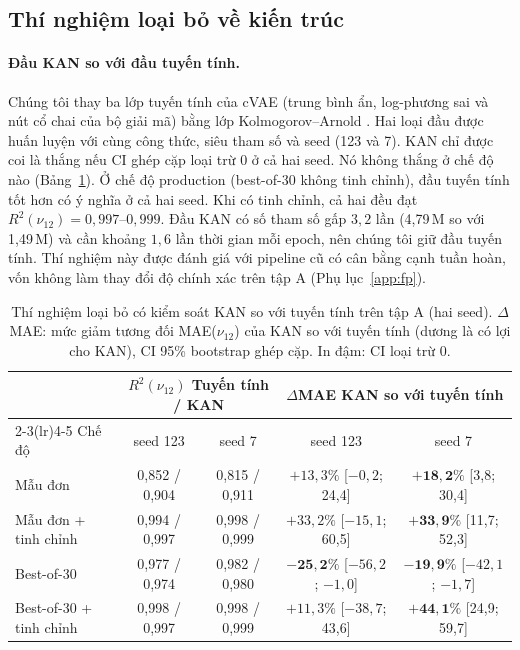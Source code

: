 \documentclass[a4paper,11pt]{article}
\newcommand{\nuot}{\nu_{12}}
\newcommand{\RR}{R^2}
\begin{document}
\subsection{Thí nghiệm loại bỏ về kiến trúc}

\paragraph{Đầu KAN so với đầu tuyến tính.}
Chúng tôi thay ba lớp tuyến tính của cVAE (trung bình ẩn, log-phương sai và
nút cổ chai của bộ giải mã) bằng lớp Kolmogorov--Arnold \citep{liu2024kan}.
Hai loại đầu được huấn luyện với cùng công thức, siêu tham số và seed (123 và
7). KAN chỉ được coi là thắng nếu CI ghép cặp loại trừ 0 ở cả hai seed. Nó
không thắng ở chế độ nào (Bảng~\ref{tab:kan}). Ở chế độ production
(best-of-30 không tinh chỉnh), đầu tuyến tính tốt hơn có ý nghĩa ở cả hai
seed. Khi có tinh chỉnh, cả hai đều đạt $\RR(\nuot)=0,997$--$0,999$. Đầu KAN
có số tham số gấp $3,2$ lần (4,79\,M so với 1,49\,M) và cần khoảng $1,6$ lần
thời gian mỗi epoch, nên chúng tôi giữ đầu tuyến tính. Thí nghiệm này được
đánh giá với pipeline cũ có cân bằng cạnh tuần hoàn, vốn không làm thay đổi
độ chính xác trên tập A (Phụ lục~\ref{app:fp}).

\begin{table}[t]
\centering
\caption{Thí nghiệm loại bỏ có kiểm soát KAN so với tuyến tính trên tập A (hai
seed). $\Delta$MAE: mức giảm tương đối MAE($\nuot$) của KAN so với tuyến tính
(dương là có lợi cho KAN), CI 95\% bootstrap ghép cặp. In đậm: CI loại trừ 0.}
\label{tab:kan}
\small
\setlength{\tabcolsep}{4pt}
\begin{tabular}{lcccc}
\toprule
 & \multicolumn{2}{c}{$\RR(\nuot)$ Tuyến tính / KAN} & \multicolumn{2}{c}{$\Delta$MAE KAN so với tuyến tính}\\
\cmidrule(lr){2-3}\cmidrule(lr){4-5}
Chế độ & seed 123 & seed 7 & seed 123 & seed 7\\
\midrule
Mẫu đơn                 & 0,852 / 0,904 & 0,815 / 0,911 & $+13,3\%$ [$-0,2$; 24,4] & $\mathbf{+18,2\%}$ [3,8; 30,4]\\
Mẫu đơn + tinh chỉnh    & 0,994 / 0,997 & 0,998 / 0,999 & $+33,2\%$ [$-15,1$; 60,5] & $\mathbf{+33,9\%}$ [11,7; 52,3]\\
Best-of-30              & 0,977 / 0,974 & 0,982 / 0,980 & $\mathbf{-25,2\%}$ [$-56,2$; $-1,0$] & $\mathbf{-19,9\%}$ [$-42,1$; $-1,7$]\\
Best-of-30 + tinh chỉnh & 0,998 / 0,997 & 0,998 / 0,999 & $+11,3\%$ [$-38,7$; 43,6] & $\mathbf{+44,1\%}$ [24,9; 59,7]\\
\bottomrule
\end{tabular}
\end{table}
\end{document}
